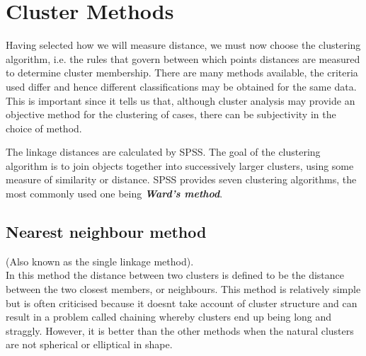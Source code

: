 
\usepackage{eurosym}
\usepackage{vmargin}
\usepackage{amsmath}
\usepackage{graphics}
\usepackage{epsfig}
\usepackage{subfigure}
\usepackage{fancyhdr}
\usepackage{framed}
\usepackage{graphicx}

\setcounter{MaxMatrixCols}{10}

\pagestyle{fancy}
\setmarginsrb{20mm}{0mm}{20mm}{25mm}{12mm}{11mm}{0mm}{11mm}
 
%

\section{Cluster Methods}
Having selected how we will measure distance, we must now choose the clustering algorithm, i.e. the rules that govern between which points distances are measured to determine cluster membership. There are many methods available, the criteria used differ and hence
different classifications may be obtained for the same data. This is important since it tells us that, although cluster analysis may provide an objective method for the clustering of cases, there can be subjectivity in the choice of method. 

The linkage distances are calculated by SPSS. The goal of the clustering algorithm is to join objects together into successively larger clusters, using some measure of similarity or distance. SPSS provides seven clustering algorithms, the most commonly used one being  \textbf{\textit{Ward's method}}.


\subsection{Nearest neighbour method} 
(Also known as the single linkage method).\\
In this method the distance between two clusters is defined to be the distance between
the two closest members, or neighbours. This method is relatively simple but is often
criticised because it doesnt take account of cluster structure and can result in a problem
called chaining whereby clusters end up being long and straggly. However, it is better
than the other methods when the natural clusters are not spherical or elliptical in shape.

